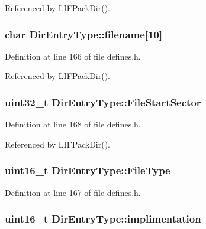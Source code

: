Referenced by L\+I\+F\+Pack\+Dir().

\subsubsection[{\texorpdfstring{filename}{filename}}]{\setlength{\rightskip}{0pt plus 5cm}char Dir\+Entry\+Type\+::filename\mbox{[}10\mbox{]}}\hypertarget{structDirEntryType_aa60fae0a6b7ba9c966cbcf46e555f396}{}\label{structDirEntryType_aa60fae0a6b7ba9c966cbcf46e555f396}


Definition at line 166 of file defines.\+h.



Referenced by L\+I\+F\+Pack\+Dir().

\subsubsection[{\texorpdfstring{File\+Start\+Sector}{FileStartSector}}]{\setlength{\rightskip}{0pt plus 5cm}uint32\+\_\+t Dir\+Entry\+Type\+::\+File\+Start\+Sector}\hypertarget{structDirEntryType_a062849a9cc935042c7a3a28ed90ab6a1}{}\label{structDirEntryType_a062849a9cc935042c7a3a28ed90ab6a1}


Definition at line 168 of file defines.\+h.



Referenced by L\+I\+F\+Pack\+Dir().

\subsubsection[{\texorpdfstring{File\+Type}{FileType}}]{\setlength{\rightskip}{0pt plus 5cm}uint16\+\_\+t Dir\+Entry\+Type\+::\+File\+Type}\hypertarget{structDirEntryType_a97b6ddc8d198c32bf4a29c4784ab7188}{}\label{structDirEntryType_a97b6ddc8d198c32bf4a29c4784ab7188}


Definition at line 167 of file defines.\+h.

\subsubsection[{\texorpdfstring{implimentation}{implimentation}}]{\setlength{\rightskip}{0pt plus 5cm}uint16\+\_\+t Dir\+Entry\+Type\+::implimentation}\hypertarget{structDirEntryType_ac406aba583917a5c26ed94df41a368a9}{}\label{structDirEntryType_ac406aba583917a5c26ed94df41a368a9}


